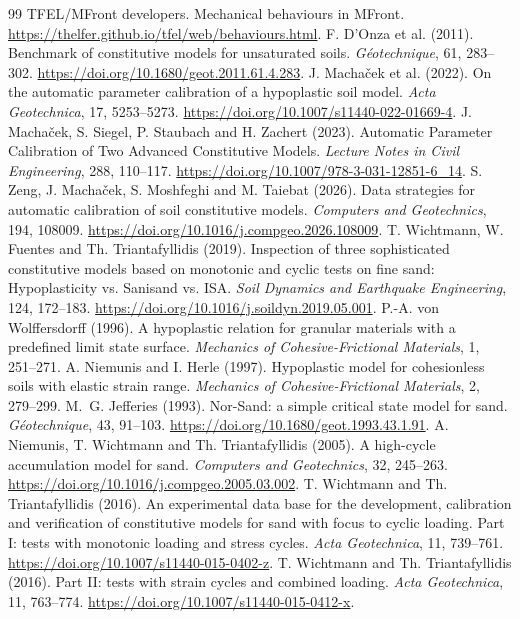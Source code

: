 \documentclass[11pt,a4paper]{article}
\begin{document}
\begin{thebibliography}{99}
\small
{} TFEL/MFront developers. Mechanical behaviours in MFront. \url{https://thelfer.github.io/tfel/web/behaviours.html}.
 F. D'Onza et al. (2011). Benchmark of constitutive models for unsaturated soils. \emph{G\'eotechnique}, 61, 283--302. \url{https://doi.org/10.1680/geot.2011.61.4.283}.
 J. Macha\v{c}ek et al. (2022). On the automatic parameter calibration of a hypoplastic soil model. \emph{Acta Geotechnica}, 17, 5253--5273. \url{https://doi.org/10.1007/s11440-022-01669-4}.
 J. Macha\v{c}ek, S. Siegel, P. Staubach and H. Zachert (2023). Automatic Parameter Calibration of Two Advanced Constitutive Models. \emph{Lecture Notes in Civil Engineering}, 288, 110--117. \url{https://doi.org/10.1007/978-3-031-12851-6_14}.
 S. Zeng, J. Macha\v{c}ek, S. Moshfeghi and M. Taiebat (2026). Data strategies for automatic calibration of soil constitutive models. \emph{Computers and Geotechnics}, 194, 108009. \url{https://doi.org/10.1016/j.compgeo.2026.108009}.
 T. Wichtmann, W. Fuentes and Th. Triantafyllidis (2019). Inspection of three sophisticated constitutive models based on monotonic and cyclic tests on fine sand: Hypoplasticity vs. Sanisand vs. ISA. \emph{Soil Dynamics and Earthquake Engineering}, 124, 172--183. \url{https://doi.org/10.1016/j.soildyn.2019.05.001}.
 P.-A. von Wolffersdorff (1996). A hypoplastic relation for granular materials with a predefined limit state surface. \emph{Mechanics of Cohesive-Frictional Materials}, 1, 251--271.
 A. Niemunis and I. Herle (1997). Hypoplastic model for cohesionless soils with elastic strain range. \emph{Mechanics of Cohesive-Frictional Materials}, 2, 279--299.
 M.~G. Jefferies (1993). Nor-Sand: a simple critical state model for sand. \emph{G\'eotechnique}, 43, 91--103. \url{https://doi.org/10.1680/geot.1993.43.1.91}.
 A. Niemunis, T. Wichtmann and Th. Triantafyllidis (2005). A high-cycle accumulation model for sand. \emph{Computers and Geotechnics}, 32, 245--263. \url{https://doi.org/10.1016/j.compgeo.2005.03.002}.
 T. Wichtmann and Th. Triantafyllidis (2016). An experimental data base for the development, calibration and verification of constitutive models for sand with focus to cyclic loading. Part I: tests with monotonic loading and stress cycles. \emph{Acta Geotechnica}, 11, 739--761. \url{https://doi.org/10.1007/s11440-015-0402-z}.
 T. Wichtmann and Th. Triantafyllidis (2016). Part II: tests with strain cycles and combined loading. \emph{Acta Geotechnica}, 11, 763--774. \url{https://doi.org/10.1007/s11440-015-0412-x}.

\end{thebibliography}
\end{document}
